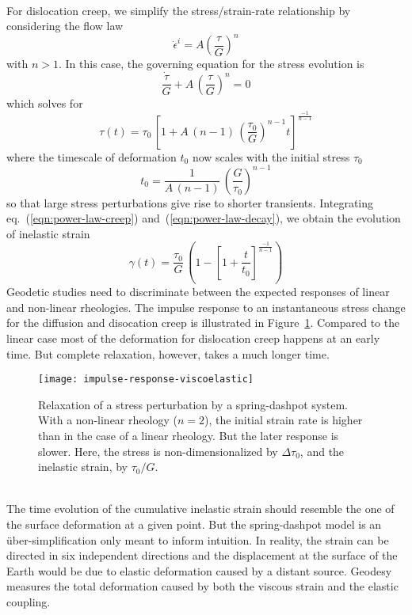 \documentclass[letterpaper,12pt,]{memoir}
\begin{document}
\\
For dislocation creep, we simplify the stress/strain-rate relationship by considering the flow law
\begin{equation}
\dot{\epsilon}^i=A\left(\frac{\tau}{G}\right)^n
\end{equation}
with $n>1$. In this case, the governing equation for the stress evolution is
\begin{equation}
\frac{\dot{\tau}}{G}+A\,\left(\frac{\tau}{G}\right)^{n}=0
\end{equation}
which solves for
\begin{equation}\label{eqn:power-law-decay}
\tau(t)=\tau_0\,\left[1+A\,(n-1)\,\left(\frac{\tau_0}{G}\right)^{n-1}t\right]^{\frac{-1}{n-1}}
\end{equation}
where the timescale of deformation $t_0$ now scales with the initial stress $\tau_0$
\begin{equation}\label{eqn:power-law_time_scale}
t_0=\frac{1}{A\,(n-1)}\,\left(\frac{G}{\tau_0}\right)^{n-1}
\end{equation}
so that large stress perturbations give rise to shorter transients. Integrating eq.~(\ref{eqn:power-law-creep}) and~(\ref{eqn:power-law-decay}), we obtain the evolution of inelastic strain\\
\begin{equation}\label{eqn:power-law-strain}
\gamma(t)=\frac{\tau_0}{G}\,\left(1-\left[1+\frac{t}{t_0}\right]^{\frac{-1}{n-1}}\right)
\end{equation}
%
Geodetic studies need to discriminate between the expected responses of linear and non-linear rheologies. The impulse response to an instantaneous stress change for the diffusion and disocation creep is illustrated in Figure~\ref{fig:creep-test}. Compared to the linear case most of the deformation for dislocation creep happens at an early time. But complete relaxation, however, takes a much longer time. \\
%
\begin{figure}[p]
\begin{center}
\texttt{[image: impulse-response-viscoelastic]}
\end{center}
\caption{Relaxation of a stress perturbation by a spring-dashpot system. With a non-linear rheology ($n=2$), the initial strain rate is higher than in the case of a linear rheology. But the later response is slower. Here, the stress is non-dimensionalized by $\Delta\tau_0$, and the inelastic strain, by $\tau_0/G$.}
\label{fig:creep-test}
\end{figure}
%
\\
The time evolution of the cumulative inelastic strain should resemble the one of the surface deformation at a given point. But the spring-dashpot model is an \"{u}ber-simplification only meant to inform intuition. In reality, the strain can be directed in six independent directions and the displacement at the surface of the Earth would be due to elastic deformation caused by a distant source. Geodesy measures the total deformation caused by both the viscous strain and the elastic coupling. 
\end{document}
